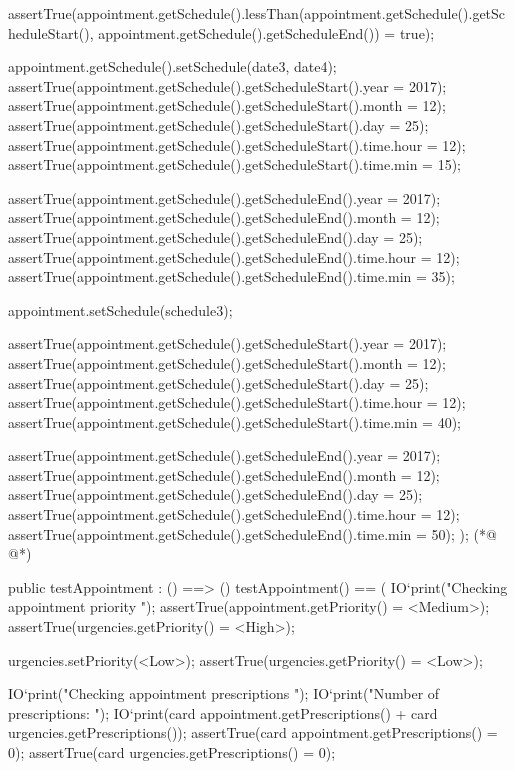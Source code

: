 \begin{vdmpp}[breaklines=true]
   assertTrue(appointment.getSchedule().lessThan(appointment.getSchedule().getScheduleStart(), appointment.getSchedule().getScheduleEnd()) = true);
   
   appointment.getSchedule().setSchedule(date3, date4);
   assertTrue(appointment.getSchedule().getScheduleStart().year = 2017);
   assertTrue(appointment.getSchedule().getScheduleStart().month = 12);
   assertTrue(appointment.getSchedule().getScheduleStart().day = 25);
   assertTrue(appointment.getSchedule().getScheduleStart().time.hour = 12);
   assertTrue(appointment.getSchedule().getScheduleStart().time.min = 15);
   
   assertTrue(appointment.getSchedule().getScheduleEnd().year = 2017);
   assertTrue(appointment.getSchedule().getScheduleEnd().month = 12);
   assertTrue(appointment.getSchedule().getScheduleEnd().day = 25);
   assertTrue(appointment.getSchedule().getScheduleEnd().time.hour = 12);
   assertTrue(appointment.getSchedule().getScheduleEnd().time.min = 35);
   
   appointment.setSchedule(schedule3);
   
   assertTrue(appointment.getSchedule().getScheduleStart().year = 2017);
   assertTrue(appointment.getSchedule().getScheduleStart().month = 12);
   assertTrue(appointment.getSchedule().getScheduleStart().day = 25);
   assertTrue(appointment.getSchedule().getScheduleStart().time.hour = 12);
   assertTrue(appointment.getSchedule().getScheduleStart().time.min = 40);
   
   assertTrue(appointment.getSchedule().getScheduleEnd().year = 2017);
   assertTrue(appointment.getSchedule().getScheduleEnd().month = 12);
   assertTrue(appointment.getSchedule().getScheduleEnd().day = 25);
   assertTrue(appointment.getSchedule().getScheduleEnd().time.hour = 12);
   assertTrue(appointment.getSchedule().getScheduleEnd().time.min = 50);
  );
(*@
\label{testAppointment:173}
@*)
  
 public testAppointment : () ==> ()
  testAppointment() == (
   IO`print("\n Checking appointment priority \n");
   assertTrue(appointment.getPriority() = <Medium>);
   assertTrue(urgencies.getPriority() = <High>);
   
   urgencies.setPriority(<Low>);
   assertTrue(urgencies.getPriority() = <Low>);
   
   IO`print("\n Checking appointment prescriptions \n");
   IO`print("\n Number of prescriptions: ");
   IO`print(card appointment.getPrescriptions() + card urgencies.getPrescriptions());
   assertTrue(card appointment.getPrescriptions() = 0);
   assertTrue(card urgencies.getPrescriptions() = 0);
   

\end{vdmpp}
